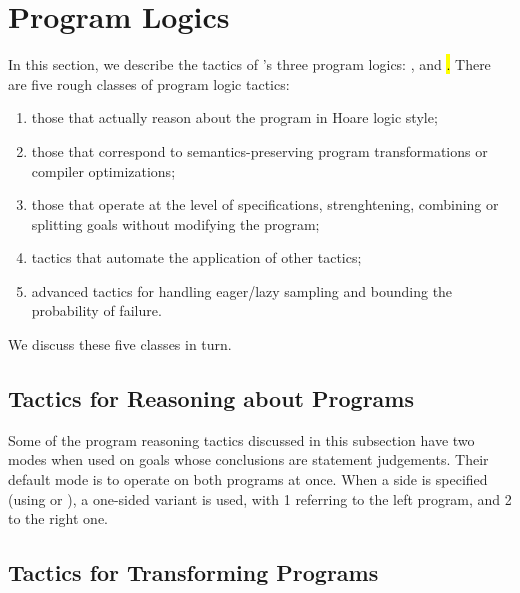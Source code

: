 \section{Program Logics}
\label{sec:programlogics}

In this section, we describe the tactics of \EasyCrypt's three program
logics: \prhl, \phl and \hl.  There are five rough classes of program
logic tactics:
\begin{enumerate}
\item those that actually reason about the program in Hoare logic
  style;

\item those that correspond to semantics-preserving program
  transformations or compiler optimizations;

\item those that operate at the level of specifications,
  strenghtening, combining or splitting goals without modifying the
  program;

\item tactics that automate the application of other tactics;

\item advanced tactics for handling eager/lazy sampling and bounding
  the probability of failure.
\end{enumerate}
We discuss these five classes in turn.

\subsection{Tactics for Reasoning about Programs}
\label{subsec:reasoningprograms}

Some of the program reasoning tactics discussed in this subsection
have two modes when used on goals whose conclusions are \prhl
statement judgements.  Their default mode is to operate on both
programs at once. When a side is specified (using  or
), a one-sided variant is used, with 1 referring to the
left program, and 2 to the right one.

\medskip











\subsection{Tactics for Transforming Programs}
\label{subsec:transformingprograms}


